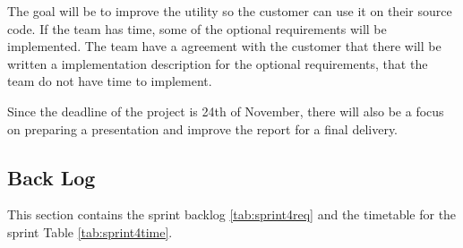 The goal will be to improve the utility so the customer can use it on their source code. If the team has time, some of the optional requirements will be implemented. The team have a agreement with the customer that there will be written a implementation description for the optional requirements, that the team do not have time to implement.

Since the deadline of the project is 24th of November, there will also be a focus on preparing a presentation and improve the report for a final delivery.

\subsection{Back Log}
This section contains the sprint backlog \ref{tab:sprint4req} and the timetable for the sprint Table \ref{tab:sprint4time}.  

